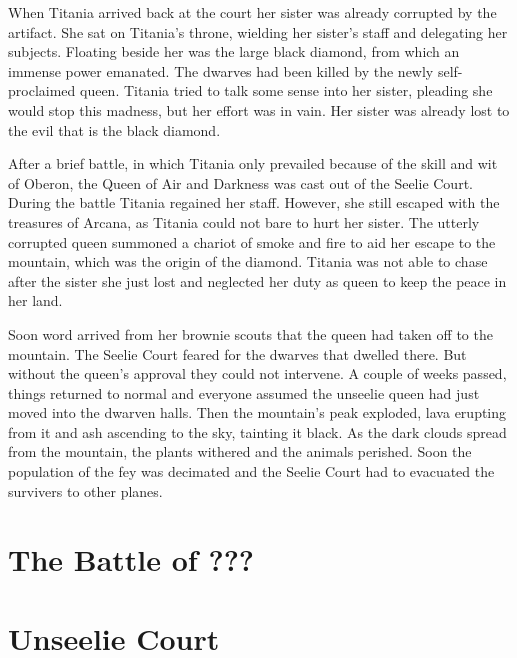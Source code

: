 \documentclass[letter,10pt,twocolumn,openany]{dndbook}
\begin{document}
When Titania arrived back at the court her sister was already corrupted by the artifact.
She sat on Titania's throne, wielding her sister's staff and delegating her subjects.
Floating beside her was the large black diamond, from which an immense power emanated.
The dwarves had been killed by the newly self-proclaimed queen.
Titania tried to talk some sense into her sister, pleading she would stop this madness, but her effort was in vain.
Her sister was already lost to the evil that is the black diamond.

After a brief battle, in which Titania only prevailed because of the skill and wit of Oberon, the Queen of Air and Darkness was cast out of the Seelie Court.
During the battle Titania regained her staff.
However, she still escaped with the treasures of Arcana, as Titania could not bare to hurt her sister.
The utterly corrupted queen summoned a chariot of smoke and fire to aid her escape to the mountain, which was the origin of the diamond.
Titania was not able to chase after the sister she just lost and neglected her duty as queen to keep the peace in her land.

Soon word arrived from her brownie scouts that the queen had taken off to the mountain.
The Seelie Court feared for the dwarves that dwelled there.
But without the queen's approval they could not intervene.
A couple of weeks passed, things returned to normal and everyone assumed the unseelie queen had just moved into the dwarven halls.
Then the mountain's peak exploded, lava erupting from it and ash ascending to the sky, tainting it black.
As the dark clouds spread from the mountain, the plants withered and the animals perished.
Soon the population of the fey was decimated and the Seelie Court had to evacuated the survivers to other planes.




\section{The Battle of ???}



\section{Unseelie Court}
\end{document}
